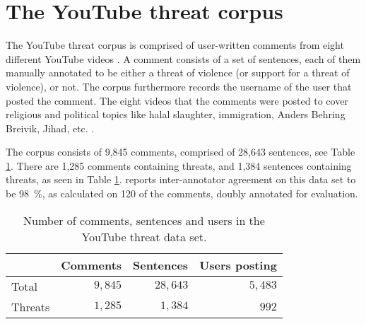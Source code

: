 \documentclass[11pt,letterpaper]{article}
\newcommand{\tov}{threat of violence}
\newcommand{\ds}{the YouTube threat data set}
\begin{document}
\section{The YouTube threat corpus}
\label{sec:data}
The YouTube threat corpus is comprised of user-written comments from eight different YouTube videos \cite{hammer2014}. A comment consists of a set of sentences, each of them manually annotated to be either a \tov{} (or support for a \tov{}), or not. The corpus furthermore records the username
  of the user that posted the comment. The eight videos that the comments were posted to cover religious and political topics like halal slaughter, immigration, Anders Behring Breivik, Jihad, etc. \cite{hammer2014}. 

The corpus consists of 9,845 comments, comprised of 28,643 sentences, see Table \ref{tab:dataset}.
There are 1,285 comments containing threats, and 1,384 sentences containing threats, as seen in Table \ref{tab:dataset}.   reports inter-annotator agreement on this data set to be 98~\%, as calculated on 120 of the comments, doubly annotated for evaluation.

\begin{table}
\begin{center}
\begin{tabular}{lrrr}
  \toprule
  
  & Comments  & Sentences  & Users posting \\
  \midrule
	
  
  Total  & $9,845$  & $28,643$  & $5,483$  \\
  Threats  & $1,285$  & $1,384$  & $992$  \\
  \bottomrule

\end{tabular}
\end{center}
\caption{Number of comments, sentences and users in \ds{}.}
\label{tab:dataset}
\end{table}
\end{document}
